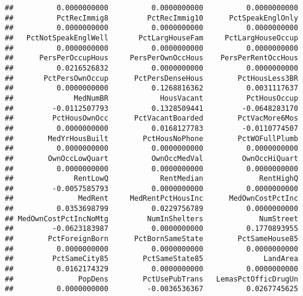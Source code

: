 \documentclass[
]{article}
\newenvironment{Shaded}{\begin{snugshade}}{\end{snugshade}}
\newcommand{\FunctionTok}[1]{\textcolor[rgb]{0.13,0.29,0.53}{\textbf{#1}}}
\newcommand{\NormalTok}[1]{#1}
\newcommand{\SpecialCharTok}[1]{\textcolor[rgb]{0.81,0.36,0.00}{\textbf{#1}}}
\begin{document}
\begin{verbatim}
##          0.0000000000          0.0000000000          0.0000000000 
##          PctRecImmig8         PctRecImmig10      PctSpeakEnglOnly 
##          0.0000000000          0.0000000000          0.0000000000 
##   PctNotSpeakEnglWell       PctLargHouseFam     PctLargHouseOccup 
##          0.0000000000          0.0000000000          0.0000000000 
##      PersPerOccupHous     PersPerOwnOccHous    PersPerRentOccHous 
##          0.0216526832          0.0000000000          0.0000000000 
##       PctPersOwnOccup      PctPersDenseHous        PctHousLess3BR 
##          0.0000000000          0.1268816362          0.0031117637 
##              MedNumBR            HousVacant          PctHousOccup 
##         -0.0112507793          0.1328509441         -0.0648283170 
##         PctHousOwnOcc      PctVacantBoarded        PctVacMore6Mos 
##          0.0000000000          0.0168127783         -0.0110774507 
##        MedYrHousBuilt        PctHousNoPhone        PctWOFullPlumb 
##          0.0000000000          0.0000000000          0.0000000000 
##        OwnOccLowQuart          OwnOccMedVal         OwnOccHiQuart 
##          0.0000000000          0.0000000000          0.0000000000 
##              RentLowQ            RentMedian             RentHighQ 
##         -0.0057585793          0.0000000000          0.0000000000 
##               MedRent     MedRentPctHousInc      MedOwnCostPctInc 
##          0.0353698799          0.0229756789          0.0000000000 
## MedOwnCostPctIncNoMtg         NumInShelters             NumStreet 
##         -0.0623183987          0.0000000000          0.1770893955 
##        PctForeignBorn      PctBornSameState        PctSameHouse85 
##          0.0000000000          0.0000000000          0.0000000000 
##         PctSameCity85        PctSameState85              LandArea 
##          0.0162174329          0.0000000000          0.0000000000 
##               PopDens        PctUsePubTrans   LemasPctOfficDrugUn 
##          0.0000000000         -0.0036536367          0.0267745625
\end{verbatim}

\begin{Shaded}
\end{Shaded}
\end{document}
